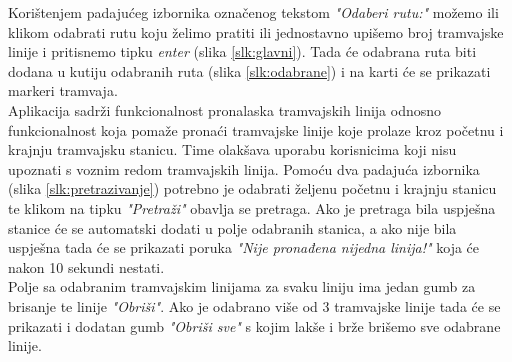 \documentclass[zavrsnirad]{fer}
\begin{document}
Korištenjem padajućeg izbornika označenog tekstom \textit{"Odaberi rutu:"} možemo ili klikom odabrati rutu koju želimo pratiti ili jednostavno upišemo broj tramvajske linije i pritisnemo tipku \textit{enter} (slika \ref{slk:glavni}). Tada će odabrana ruta biti dodana u kutiju odabranih ruta (slika \ref{slk:odabrane}) i na karti će se prikazati markeri tramvaja.\\
\newpage
Aplikacija sadrži funkcionalnost pronalaska tramvajskih linija odnosno funkcionalnost koja pomaže pronaći tramvajske linije koje prolaze kroz početnu i krajnju tramvajsku stanicu. Time olakšava uporabu korisnicima koji nisu upoznati s voznim redom tramvajskih linija. Pomoću dva padajuća izbornika (slika \ref{slk:pretrazivanje}) potrebno je odabrati željenu početnu i krajnju stanicu te klikom na tipku \textit{"Pretraži"} obavlja se pretraga. Ako je pretraga bila uspješna stanice će se automatski dodati u polje odabranih stanica, a ako nije bila uspješna tada će se prikazati poruka \textit{"Nije pronađena nijedna linija!"} koja će nakon 10 sekundi nestati.\\
Polje sa odabranim tramvajskim linijama za svaku liniju ima jedan gumb za brisanje te linije \textit{"Obriši"}. Ako je odabrano više od 3 tramvajske linije tada će se prikazati i dodatan gumb \textit{"Obriši sve"} s kojim lakše i brže brišemo sve odabrane linije.\\
\end{document}
